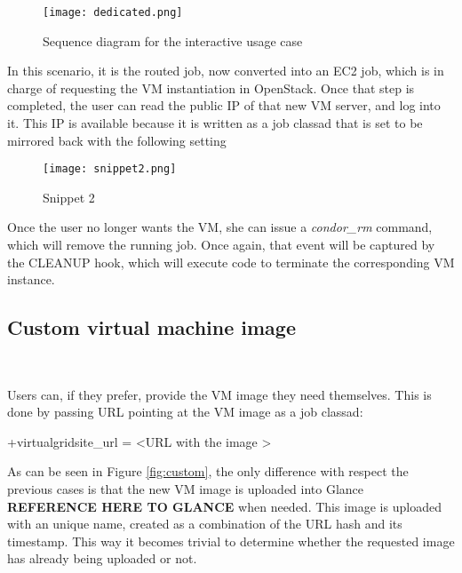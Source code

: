 \documentclass[a4paper]{jpconf}
\begin{document}
\begin{figure}[h]
    \centering
    \texttt{[image: dedicated.png]}
    \caption{Sequence diagram for the interactive usage case}
    \label{fig:interactive}
\end{figure}

In this scenario, it is the routed job, now converted into an EC2 job, 
which is in charge of requesting the VM instantiation in OpenStack.
Once that step is completed, the user can read the public IP of that new VM server, and log into it. 
This IP is available because it is written as a job classad that is set to be
mirrored back with the following setting

\begin{figure}[h]
    \centering
    \texttt{[image: snippet2.png]}
    \caption{Snippet 2}
    \label{fig:snippet2}
\end{figure}


Once the user no longer wants the VM, she can issue a \textit{condor\_rm}
command, which will remove the running job. 
Once again, that event will be captured by the CLEANUP hook, which will execute
code to terminate the corresponding VM instance.


\subsection{Custom virtual machine image}

~

Users can, if they prefer, provide the VM image they need themselves. 
This is done by passing URL pointing at the VM image as a job classad:
\begin{center}
    +virtualgridsite\_url = \textless URL with the image \textgreater
\end{center}

As can be seen in Figure \ref{fig:custom}, 
the only difference with respect the previous cases is that the new VM image is uploaded into Glance \textbf{REFERENCE HERE TO GLANCE} when needed.
This image is uploaded with an unique name, 
created as a combination of the URL hash and its timestamp. 
This way it becomes trivial to determine whether the requested image has already being uploaded or not. 
\end{document}
